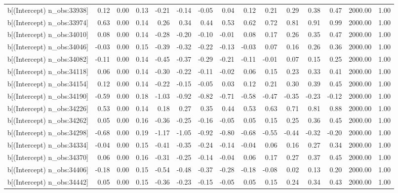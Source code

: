 \begin{table}[ht]
\begin{tabular}{rrrrrrrrrrrrrrr}
  b[(Intercept) n\_obs:33938] & 0.12 & 0.00 & 0.13 & -0.21 & -0.14 & -0.05 & 0.04 & 0.12 & 0.21 & 0.29 & 0.38 & 0.47 & 2000.00 & 1.00 \\ 
  b[(Intercept) n\_obs:33974] & 0.63 & 0.00 & 0.14 & 0.26 & 0.34 & 0.44 & 0.53 & 0.62 & 0.72 & 0.81 & 0.91 & 0.99 & 2000.00 & 1.00 \\ 
  b[(Intercept) n\_obs:34010] & 0.08 & 0.00 & 0.14 & -0.28 & -0.20 & -0.10 & -0.01 & 0.08 & 0.17 & 0.26 & 0.35 & 0.47 & 2000.00 & 1.00 \\ 
  b[(Intercept) n\_obs:34046] & -0.03 & 0.00 & 0.15 & -0.39 & -0.32 & -0.22 & -0.13 & -0.03 & 0.07 & 0.16 & 0.26 & 0.36 & 2000.00 & 1.00 \\ 
  b[(Intercept) n\_obs:34082] & -0.11 & 0.00 & 0.14 & -0.45 & -0.37 & -0.29 & -0.21 & -0.11 & -0.01 & 0.07 & 0.15 & 0.25 & 2000.00 & 1.00 \\ 
  b[(Intercept) n\_obs:34118] & 0.06 & 0.00 & 0.14 & -0.30 & -0.22 & -0.11 & -0.02 & 0.06 & 0.15 & 0.23 & 0.33 & 0.41 & 2000.00 & 1.00 \\ 
  b[(Intercept) n\_obs:34154] & 0.12 & 0.00 & 0.14 & -0.22 & -0.15 & -0.05 & 0.03 & 0.12 & 0.21 & 0.30 & 0.39 & 0.45 & 2000.00 & 1.00 \\ 
  b[(Intercept) n\_obs:34190] & -0.59 & 0.00 & 0.18 & -1.03 & -0.92 & -0.82 & -0.71 & -0.58 & -0.47 & -0.35 & -0.23 & -0.12 & 2000.00 & 1.00 \\ 
  b[(Intercept) n\_obs:34226] & 0.53 & 0.00 & 0.14 & 0.18 & 0.27 & 0.35 & 0.44 & 0.53 & 0.63 & 0.71 & 0.81 & 0.88 & 2000.00 & 1.00 \\ 
  b[(Intercept) n\_obs:34262] & 0.05 & 0.00 & 0.16 & -0.36 & -0.25 & -0.16 & -0.05 & 0.05 & 0.15 & 0.25 & 0.36 & 0.45 & 2000.00 & 1.00 \\ 
  b[(Intercept) n\_obs:34298] & -0.68 & 0.00 & 0.19 & -1.17 & -1.05 & -0.92 & -0.80 & -0.68 & -0.55 & -0.44 & -0.32 & -0.20 & 2000.00 & 1.00 \\ 
  b[(Intercept) n\_obs:34334] & -0.04 & 0.00 & 0.15 & -0.41 & -0.35 & -0.24 & -0.14 & -0.04 & 0.06 & 0.16 & 0.27 & 0.34 & 2000.00 & 1.00 \\ 
  b[(Intercept) n\_obs:34370] & 0.06 & 0.00 & 0.16 & -0.31 & -0.25 & -0.14 & -0.04 & 0.06 & 0.17 & 0.27 & 0.37 & 0.45 & 2000.00 & 1.00 \\ 
  b[(Intercept) n\_obs:34406] & -0.18 & 0.00 & 0.15 & -0.54 & -0.48 & -0.37 & -0.28 & -0.18 & -0.08 & 0.02 & 0.13 & 0.20 & 2000.00 & 1.00 \\ 
  b[(Intercept) n\_obs:34442] & 0.05 & 0.00 & 0.15 & -0.36 & -0.23 & -0.15 & -0.05 & 0.05 & 0.15 & 0.24 & 0.34 & 0.43 & 2000.00 & 1.00 \\ 

\end{tabular}
\end{table}

